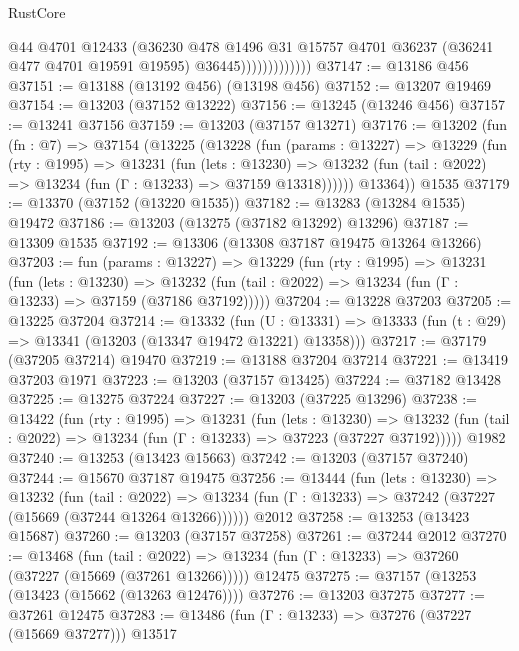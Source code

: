 \begin{lexlean}{RustCore}
\begin{coremodule}
                            @44
                            @4701
                            @12433
                            (@36230
                              @478
                              @1496
                              @31
                              @15757
                              @4701
                              @36237
                              (@36241 @477 @4701 @19591 @19595)
                              @36445)))))))))))))
@37147 := @13186 @456
@37151 := @13188 (@13192 @456) (@13198 @456)
@37152 := @13207 @19469
@37154 := @13203 (@37152 @13222)
@37156 := @13245 (@13246 @456)
@37157 := @13241 @37156
@37159 := @13203 (@37157 @13271)
@37176 := @13202
    (fun (fn : @7) =>
    @37154
      (@13225
        (@13228
          (fun (params : @13227) =>
          @13229
            (fun (rty : @1995) =>
            @13231
              (fun (lets : @13230) =>
              @13232 (fun (tail : @2022) => @13234 (fun (Γ : @13233) => @37159 @13318))))))
        @13364))
    @1535
@37179 := @13370 (@37152 (@13220 @1535))
@37182 := @13283 (@13284 @1535) @19472
@37186 := @13203 (@13275 (@37182 @13292) @13296)
@37187 := @13309 @1535
@37192 := @13306 (@13308 @37187 @19475 @13264 @13266)
@37203 := fun (params : @13227) =>
  @13229
    (fun (rty : @1995) =>
    @13231
      (fun (lets : @13230) =>
      @13232 (fun (tail : @2022) => @13234 (fun (Γ : @13233) => @37159 (@37186 @37192)))))
@37204 := @13228 @37203
@37205 := @13225 @37204
@37214 := @13332
    (fun (U : @13331) => @13333 (fun (t : @29) => @13341 (@13203 (@13347 @19472 @13221) @13358)))
@37217 := @37179 (@37205 @37214) @19470
@37219 := @13188 @37204 @37214
@37221 := @13419 @37203 @1971
@37223 := @13203 (@37157 @13425)
@37224 := @37182 @13428
@37225 := @13275 @37224
@37227 := @13203 (@37225 @13296)
@37238 := @13422
    (fun (rty : @1995) =>
    @13231
      (fun (lets : @13230) =>
      @13232 (fun (tail : @2022) => @13234 (fun (Γ : @13233) => @37223 (@37227 @37192)))))
    @1982
@37240 := @13253 (@13423 @15663)
@37242 := @13203 (@37157 @37240)
@37244 := @15670 @37187 @19475
@37256 := @13444
    (fun (lets : @13230) =>
    @13232
      (fun (tail : @2022) =>
      @13234 (fun (Γ : @13233) => @37242 (@37227 (@15669 (@37244 @13264 @13266))))))
    @2012
@37258 := @13253 (@13423 @15687)
@37260 := @13203 (@37157 @37258)
@37261 := @37244 @2012
@37270 := @13468
    (fun (tail : @2022) => @13234 (fun (Γ : @13233) => @37260 (@37227 (@15669 (@37261 @13266)))))
    @12475
@37275 := @37157 (@13253 (@13423 (@15662 (@13263 @12476))))
@37276 := @13203 @37275
@37277 := @37261 @12475
@37283 := @13486 (fun (Γ : @13233) => @37276 (@37227 (@15669 @37277))) @13517

\end{coremodule}
\end{lexlean}

